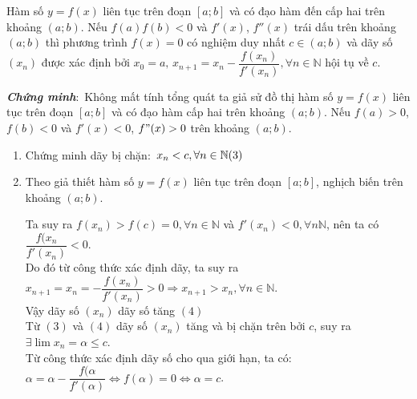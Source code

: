 \begin{dl}
Hàm số $y=f(x)$ liên tục trên đoạn $[a;b]$ và có đạo hàm đến cấp hai trên khoảng $(a;b)$. Nếu $f(a)f(b)<0$ và $f'(x)$, $f''(x)$ trái dấu trên khoảng $(a;b)$ thì phương trình $f(x)=0$ có nghiệm duy nhất $c\in (a;b)$ và dãy số $(x_n)$ được xác định bởi $x_0 = a,\, x_{n+1}=x_n-\dfrac{f(x_n)}{f'(x_n)}, \forall n\in\mathbb{N}$ hội tụ về $c$.
\end{dl}
\textbf{\textit{Chứng minh$\colon$}}
Không mất tính tổng quát ta giả sử đồ thị hàm số $y=f(x)$ liên tục trên đoạn $[a;b]$ và có đạo hàm cấp hai trên khoảng $(a;b)$. Nếu $f(a) >0$, $f(b)<0$ và $f'(x) <0$, $f"(x) >0 $ trên khoảng $(a;b)$.
\begin{enumerate}[1)]
\item Chứng minh dãy bị chặn$\colon$ $x_n <c, \forall n\in \mathbb{N}\hfill (3)$
\item Theo giả thiết hàm số $y=f(x)$ liên tục trên đoạn $[a;b]$, nghịch biến trên khoảng $(a;b)$.

Ta suy ra $f(x_n) >f(c) =0,\forall n\in\mathbb{N}$ và $f'(x_n) <0, \forall n\mathbb{N}$, nên ta có $\dfrac{f(x_n}{f'(x_n)}<0$.\\
Do đó từ công thức xác định dãy, ta suy ra  $x_{n+1}=x_n=-\dfrac{f(x_n)}{f'(x_n)}>0\Rightarrow x_{n+1}>x_n, \forall n\in \mathbb{N}$.\\
Vậy dãy số $(x_n)$ dãy số tăng \hfill $(4)$\\
Từ $(3)$ và $(4)$ dãy số $(x_n)$ tăng và bị chặn trên bởi $c$, suy ra $\exists\displaystyle\lim x_n =\alpha \le c$.\\
Từ công thức xác định dãy số cho qua giới hạn, ta có$\colon$ $\alpha =\alpha -\dfrac{f(\alpha}{f'(\alpha )}\Leftrightarrow f(\alpha ) =0 \Leftrightarrow \alpha =c$.
\end{enumerate}

